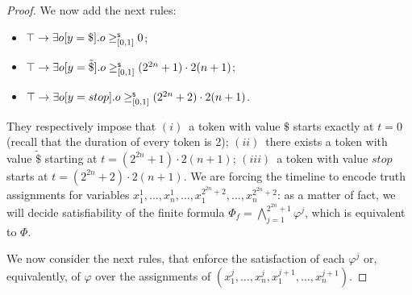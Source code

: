 \begin{proof}
We now add the next rules:
\begin{itemize}
\item
    $\operatorname{\top} \to \exists o[y=\$]. o\geq^{\mathsf{s}}_{[0,1]} 0$;
\item
    $\operatorname{\top} \to \exists o[y=\tilde{\$}]. o\geq^{\mathsf{s}}_{[0,1]} (2^{2n}+1)\cdot 2(n+1)$;
\item
    $\operatorname{\top} \to \exists o[y=stop]. o\geq^{\mathsf{s}}_{[0,1]} (2^{2n}+2)\cdot 2(n+1)$.
\end{itemize}
They respectively impose that $(i)$~a token with value $\$$ starts exactly at $t=0$ (recall that the duration of every token is 2);
$(ii)$~there exists a token with value $\tilde{\$}$ starting at $t=(2^{2n}+1)\cdot 2(n+1)$; 
$(iii)$~a token with value $stop$ starts at $t=(2^{2n}+2)\cdot 2(n+1)$. 
We are forcing the timeline to encode truth assignments for variables $x_1^1,\ldots, x_n^1,\ldots, x_1^{2^{2n}+2} ,\ldots , x_n^{2^{2n}+2}$: as a matter of fact, we will decide satisfiability of the finite formula $\Phi_f= \bigwedge_{j= 1}^{2^{2n}+1} \varphi^j$, which is equivalent to $\Phi$.


We now consider the next rules, that enforce the satisfaction of each $\varphi^j$ or,
equivalently, of $\varphi$ over the assignments of $(x_1^j,\ldots, x_n^j, x_1^{j+1},\ldots, x_n^{j+1})$.


\end{proof}
